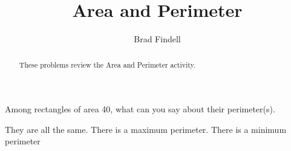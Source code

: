 \documentclass[nooutcomes]{ximera}
\title{Area and Perimeter}
\author{Brad Findell}
\begin{document}
\begin{abstract}
These problems review the Area and Perimeter activity.  
\end{abstract}
\maketitle

Among rectangles of area 40, what can you say about their perimeter(s).  


They are all the same. 
There is a maximum perimeter. 
There is a minimum perimeter 
\end{document}
